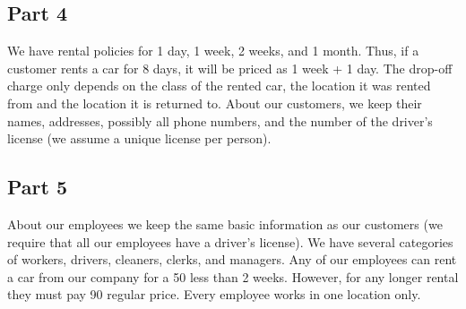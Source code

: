 \begin{subappendices}
\subsection*{Part 4}

We have rental policies for 1 day, 1 week, 2 weeks, and 1 month. Thus, if a
customer rents a car for 8 days, it will be priced as 1 week + 1 day. The
drop-off charge only depends on the class of the rented car, the location it was
rented from and the location it is returned to. About our customers, we keep
their names, addresses, possibly all phone numbers, and the number of the
driver’s license (we assume a unique license per person). 

\subsection*{Part 5}

About our employees we keep the same basic information as our customers (we
require that all our employees have a driver’s license). We have several
categories of workers, drivers, cleaners, clerks, and managers. Any of our
employees can rent a car from our company for a 50%
less than 2 weeks. However, for any longer rental they must pay 90%
regular price. Every employee works in one location only. 

\end{subappendices}


